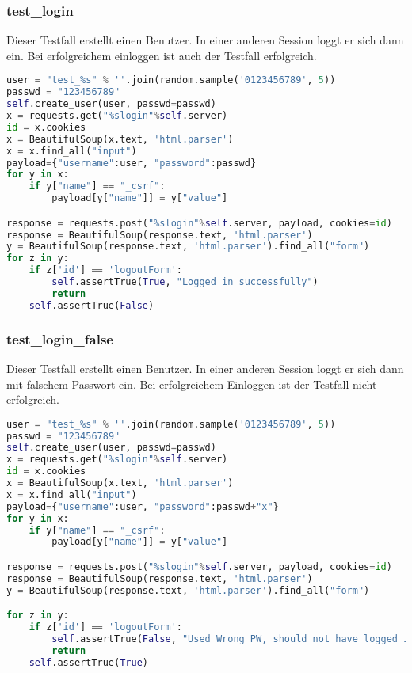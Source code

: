 \subsubsection{test\_login}
Dieser Testfall erstellt einen Benutzer. In einer anderen Session loggt er sich
 dann ein. Bei erfolgreichem einloggen ist auch der Testfall erfolgreich. 
\begin{lstlisting}[language=Python]
user = "test_%s" % ''.join(random.sample('0123456789', 5))
passwd = "123456789"
self.create_user(user, passwd=passwd)
x = requests.get("%slogin"%self.server)
id = x.cookies
x = BeautifulSoup(x.text, 'html.parser')
x = x.find_all("input")
payload={"username":user, "password":passwd}
for y in x:
    if y["name"] == "_csrf":
        payload[y["name"]] = y["value"]

response = requests.post("%slogin"%self.server, payload, cookies=id)
response = BeautifulSoup(response.text, 'html.parser')
y = BeautifulSoup(response.text, 'html.parser').find_all("form")
for z in y:
    if z['id'] == 'logoutForm':
        self.assertTrue(True, "Logged in successfully")
        return
    self.assertTrue(False)
\end{lstlisting}

\subsubsection{test\_login\_false}
Dieser Testfall erstellt einen Benutzer. In einer anderen Session loggt er sich
 dann mit falschem Passwort ein. Bei erfolgreichem Einloggen ist der Testfall nicht erfolgreich. 
\begin{lstlisting}[language=Python]
user = "test_%s" % ''.join(random.sample('0123456789', 5))
passwd = "123456789"
self.create_user(user, passwd=passwd)
x = requests.get("%slogin"%self.server)
id = x.cookies
x = BeautifulSoup(x.text, 'html.parser')
x = x.find_all("input")
payload={"username":user, "password":passwd+"x"}
for y in x:
    if y["name"] == "_csrf":
        payload[y["name"]] = y["value"]

response = requests.post("%slogin"%self.server, payload, cookies=id)
response = BeautifulSoup(response.text, 'html.parser')
y = BeautifulSoup(response.text, 'html.parser').find_all("form")

for z in y:
    if z['id'] == 'logoutForm':
        self.assertTrue(False, "Used Wrong PW, should not have logged in")
        return
    self.assertTrue(True)
\end{lstlisting}

